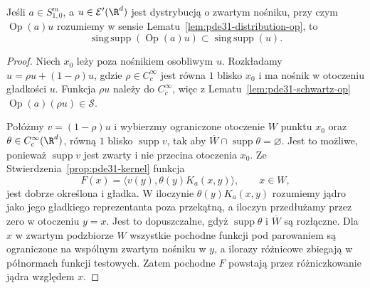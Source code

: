 \begin{wniosek}
\label{cor:pde31-pseudolocal}
Jeśli $a\in S^m_{1,0}$, a $u\in\mathcal E'(\R^d)$
jest dystrybucją o zwartym nośniku, przy czym
$\operatorname{Op}(a)u$ rozumiemy w sensie
Lematu~\ref{lem:pde31-distribution-op}, to
\[
 \operatorname{sing\,supp}(\operatorname{Op}(a)u)
 \subset\operatorname{sing\,supp}(u).
\]
\end{wniosek}
\begin{proof}
Niech $x_0$ leży poza nośnikiem osobliwym $u$.
Rozkładamy $u=\rho u+(1-\rho)u$, gdzie
$\rho\in C_c^\infty$ jest równa $1$ blisko $x_0$
i ma nośnik w otoczeniu gładkości $u$.
Funkcja $\rho u$ należy do $C_c^\infty$,
więc z Lematu~\ref{lem:pde31-schwartz-op}
$\operatorname{Op}(a)(\rho u)\in\mathcal S$.

Połóżmy $v=(1-\rho)u$ i wybierzmy ograniczone
otoczenie $W$ punktu $x_0$ oraz
$\theta\in C_c^\infty(\R^d)$, równą $1$ blisko
$\operatorname{supp}v$, tak aby
$\overline W\cap\operatorname{supp}\theta=\varnothing$.
Jest to możliwe, ponieważ $\operatorname{supp}v$
jest zwarty i nie przecina otoczenia $x_0$.
Ze Stwierdzenia~\ref{prop:pde31-kernel} funkcja
\[
 F(x)=\langle v(y),\theta(y)K_a(x,y)\rangle,\qquad x\in W,
\]
jest dobrze określona i gładka. W iloczynie
$\theta(y)K_a(x,y)$ rozumiemy jądro jako jego
gładkiego reprezentanta poza przekątną, a iloczyn
przedłużamy przez zero w otoczeniu $y=x$.
Jest to dopuszczalne, gdyż $\operatorname{supp}\theta$
i $\overline W$ są rozłączne.
Dla $x$ w zwartym podzbiorze $W$ wszystkie
pochodne funkcji pod parowaniem są ograniczone
na wspólnym zwartym nośniku w $y$,
a ilorazy różnicowe zbiegają w półnormach
funkcji testowych. Zatem pochodne $F$ powstają
przez różniczkowanie jądra względem $x$.


\end{proof}
